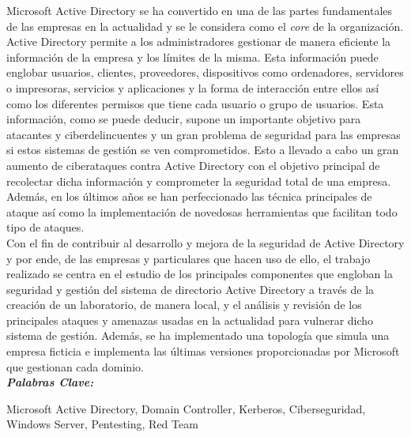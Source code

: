 
\setcounter{page}{5}
	

Microsoft Active Directory se ha convertido en una de las partes fundamentales de las empresas en la actualidad y se le considera como el {\it core} de la organización. Active Directory permite a los administradores gestionar de manera eficiente la información de la empresa y los límites de la misma. Esta información puede englobar usuarios, clientes, proveedores, dispositivos como ordenadores, servidores o impresoras, servicios y aplicaciones y la forma de interacción entre ellos así como los diferentes permisos que tiene cada usuario o grupo de usuarios. Esta información, como se puede deducir, supone un importante objetivo para atacantes y ciberdelincuentes y un gran problema de seguridad para las empresas si estos sistemas de gestión se ven comprometidos. Esto a llevado a cabo un gran aumento de ciberataques contra Active Directory con el objetivo principal de recolectar dicha información y comprometer la seguridad total de una empresa. Además, en los últimos años se han perfeccionado las técnica principales de ataque así como la implementación de novedosas herramientas que facilitan todo tipo de ataques.\\ 

Con el fin de contribuir al desarrollo y mejora de la seguridad de Active Directory y por ende, de las empresas y particulares que hacen uso de ello, el trabajo realizado se centra en el estudio de los principales componentes que engloban la seguridad y gestión del sistema de directorio Active Directory a través de la creación de un laboratorio, de manera local, y el análisis y revisión de los principales ataques y amenazas usadas en la actualidad para vulnerar dicho sistema de gestión. Además, se ha implementado una topología que simula una empresa ficticia e implementa las últimas versiones proporcionadas por Microsoft que gestionan cada dominio. \\

\textit{\textbf{Palabras Clave:}}

Microsoft Active Directory, Domain Controller, Kerberos, Ciberseguridad, Windows Server, Pentesting, Red Team
	
		
\vfill
\newpage %
\thispagestyle{empty}
\mbox{}